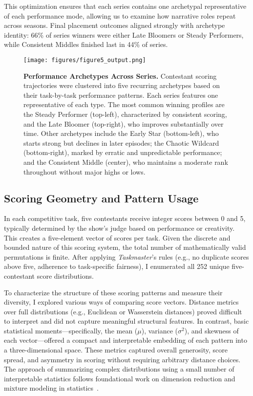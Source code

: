 \documentclass[10pt,letterpaper]{article}
\begin{document}
This optimization ensures that each series contains one archetypal representative of each performance mode, allowing us to examine how narrative roles repeat across seasons. Final placement outcomes aligned strongly with archetype identity: 66\% of series winners were either Late Bloomers or Steady Performers, while Consistent Middles finished last in 44\% of series.

\begin{figure}[!h]
\centering
\texttt{[image: figures/figure5\_output.png]}
\caption{{\bf Performance Archetypes Across Series.}
Contestant scoring trajectories were clustered into five recurring archetypes based on their task-by-task performance patterns. Each series features one representative of each type. The most common winning profiles are the Steady Performer (top-left), characterized by consistent scoring, and the Late Bloomer (top-right), who improves substantially over time. Other archetypes include the Early Star (bottom-left), who starts strong but declines in later episodes; the Chaotic Wildcard (bottom-right), marked by erratic and unpredictable performance; and the Consistent Middle (center), who maintains a moderate rank throughout without major highs or lows.}
\label{fig:performance_archetypes}
\end{figure}
\FloatBarrier


\subsection*{Scoring Geometry and Pattern Usage}

In each competitive task, five contestants receive integer scores between 0 and 5, typically determined by the show's judge based on performance or creativity. This creates a five-element vector of scores per task. Given the discrete and bounded nature of this scoring system, the total number of mathematically valid permutations is finite. After applying \textit{Taskmaster}'s rules (e.g., no duplicate scores above five, adherence to task-specific fairness), I enumerated all 252 unique five-contestant score distributions.

To characterize the structure of these scoring patterns and measure their diversity, I explored various ways of comparing score vectors. Distance metrics over full distributions (e.g., Euclidean or Wasserstein distances) proved difficult to interpret and did not capture meaningful structural features. In contrast, basic statistical moments—specifically, the mean ($\mu$), variance ($\sigma^2$), and skewness of each vector—offered a compact and interpretable embedding of each pattern into a three-dimensional space. These metrics captured overall generosity, score spread, and asymmetry in scoring without requiring arbitrary distance choices. The approach of summarizing complex distributions using a small number of interpretable statistics follows foundational work on dimension reduction and mixture modeling in statistics~\cite{Pearson1901,Hotelling1933,McLachlan2000}.
\end{document}
